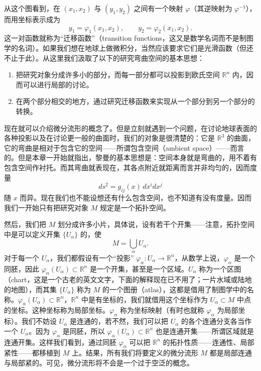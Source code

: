 从这个图看到，在 $(x_1,x_2)$ 与 $(y_1,y_2)$ 之间有一个映射 $\varphi$（其逆映射为 $\varphi^{-1}$），而用坐标表示成为
\begin{equation}
 y_1=\varphi_1(x_1,x_2),\qquad y_2=\varphi_2(x_1,x_2).
 \tag{1}
\end{equation}
这一对函数就称为“迁移函数”（transition functions，这又是数学名词而不是制图学的名词）。如果我们想在地球上做微积分，当然应该要求它们是光滑函数（但还不止于此）。从这里我们汲取了以下的研究弯曲空间的基本思想：

\begin{enumerate}[label=\arabic*.,leftmargin=2.8em]
\item 把研究对象分成许多小的部分，而每一部分都可以投影到欧氏空间 $\mathbb R^n$ 内，因而可以进行局部的讨论。
\item 在两个部分相交的地方，通过研究迁移函数来实现从一个部分到另一个部分的转换。
\end{enumerate}

现在就可以介绍微分流形的概念了。但是立刻就遇到一个问题，在讨论地球表面的各种投影以及在讨论更一般的曲面时，我们的对象是很清楚的：它是 $\mathbb R^3$ 的曲面，它的弯曲是相对于包含它的空间——所谓包含空间（ambient space）——而言的。但是本章一开始就指出，黎曼的基本思想是：空间本身就是弯曲的，用不着有包含空间作衬托。而其弯曲就表现在，其各点附近就距离而言并非均匀的，因而度量
\[
 ds^2=g_{ij}(x)\,dx^i dx^j
\]
随 $x$ 而异。现在我们也不能设想还有什么包含空间，也不知道有没有度量。因而我们一开始只有把研究对象 $M$ 规定是一个拓扑空间。

然后，我们把 $M$ 划分成许多小片，具体说，设有若干个开集——注意，拓扑空间中是可以定义开集 $\{U_\alpha\}$ 的，使
\[
 M=\bigcup_\alpha U_\alpha.
\]
对于每一个 $U_\alpha$，我们都假设有一个“投影” $\varphi_\alpha:U_\alpha\to\mathbb R^n$，从数学上说，$\varphi_\alpha$ 是一个同胚，因此 $\varphi_\alpha(U_\alpha)\subset\mathbb R^n$ 是一个开集，甚至是一个区域。$U_\alpha$ 称为一个区图（chart，这是一个古老的英文文字，下面的解释现在已不用了；一片水域或陆地的地图），而其集 $\{U_\alpha\}$ 称为 $M$ 的一个图册（atlas），这都是借用了制图学中的名称。$\varphi_\alpha(U_\alpha)\subset\mathbb R^n$，$\mathbb R^n$ 中是有坐标的，我们就借用这个坐标作为 $U_\alpha\subset M$ 中点的坐标。这种坐标称为局部坐标。$\varphi_\alpha$ 称为坐标映射（有时也就称 $\varphi_\alpha$ 为局部坐标）。我们不妨设 $U_\alpha$ 是连通的，若不然，我们可以把 $U_\alpha$ 的各个连通分支各当作一个 $U_\alpha$。因为 $\varphi_\alpha$ 是同胚，所以 $\varphi_\alpha(U_\alpha)\subset\mathbb R^n$ 也是连通开集——所谓区域就是连通开集。这样我们看到，通过同胚 $\varphi_\alpha$ 可以把 $\mathbb R^n$ 的拓扑性质——连通性、局部紧性——都移植到 $M$ 上。结果，所有我们将要定义的微分流形 $M$ 都是局部连通与局部紧的。可见，微分流形将不会是一个过于空泛的概念。

